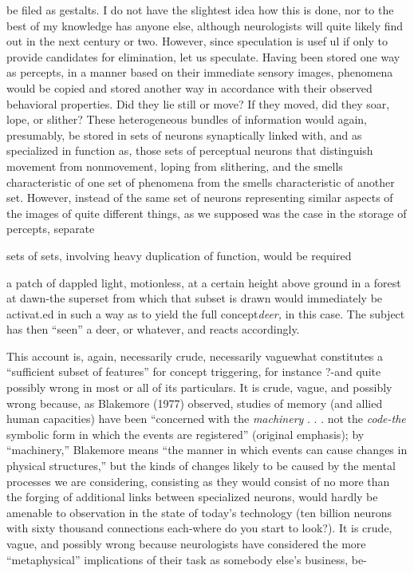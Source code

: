 be filed as gestalts. I do not have the slightest idea how this is done, nor to the best of my knowledge has anyone else, although neurologists will quite likely find out in the next century or two. However, since speculation is usef ul if only to provide candidates for elimination, let us speculate. Having been stored one way as percepts, in a manner based on their immediate sensory images, phenomena would be copied and stored another way in accordance with their observed behavioral properties. Did they lie still or move? If they moved, did they soar, lope, or slither? These heterogeneous bundles of information would again, presumably, be stored in sets of neurons synaptically linked with, and as specialized in function as, those sets of perceptual neurons that distinguish movement from nonmovement, loping from slithering, and the smells characteristic of one set of phenomena from the smells characteristic of another set. However, instead of the same set of neurons representing similar aspects of the images of quite different things, as we supposed was the case in the storage of percepts, separate

sets of sets, involving heavy duplication of function, would be required


a patch of dappled light, motionless, at a certain height above ground in a forest at dawn{}-the superset from which that subset is drawn would immediately be activat.ed in such a way as to yield the full concept\-\textit{deer,} in this case. The subject has then ``seen'' a deer, or whatever, and reacts accordingly.

This account is, again, necessarily crude, necessarily vague\-what constitutes a ``sufficient subset of features'' for concept trig\-gering, for instance ?-and quite possibly wrong in most or all of its particulars. It is crude, vague, and possibly wrong because, as Blake\-more (1977) observed, studies of memory (and allied human capacities) have been ``concerned with the \textit{machinery} . . . not the \textit{code-the }sym\-bolic form in which the events are registered'' (original emphasis); by ``machinery,'' Blakemore means ``the manner in which events can cause changes in physical structures,'' but the kinds of changes likely to be caused by the mental processes we are considering, consisting as they would consist of no more than the forging of additional links between specialized neurons, would hardly be amenable to observation in the state of today's technology (ten billion neurons with sixty thousand connections each-where do you start to look?). It is crude, vague, and possibly wrong because neurologists have considered the more ``meta\-physical'' implications of their task as somebody else's business, be-

